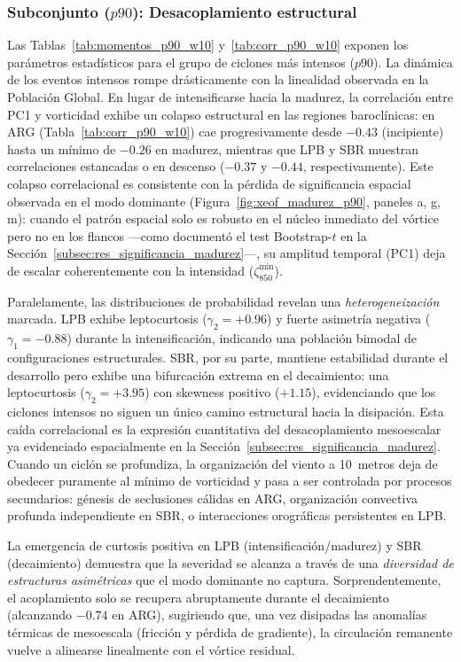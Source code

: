 \subsubsection{Subconjunto ($p90$): Desacoplamiento estructural}

Las Tablas~\ref{tab:momentos_p90_w10} y~\ref{tab:corr_p90_w10} exponen los parámetros estadísticos para el grupo de ciclones más intensos ($p90$). 
La dinámica de los eventos intensos rompe drásticamente con la linealidad observada en la Población Global. 
En lugar de intensificarse hacia la madurez, la correlación entre PC1 y vorticidad exhibe un colapso estructural en las regiones baroclínicas: en ARG (Tabla~\ref{tab:corr_p90_w10}) cae progresivamente desde $-0.43$ (incipiente) hasta un 
mínimo de $-0.26$ en madurez, mientras que LPB y SBR muestran correlaciones estancadas o en descenso ($-0.37$ y $-0.44$, respectivamente). 
Este colapso correlacional es consistente con la pérdida de significancia espacial observada en el modo dominante (Figura~\ref{fig:xeof_madurez_p90}, paneles a, g, m): cuando el patrón espacial solo es robusto en el núcleo inmediato del vórtice pero no en los flancos ---como documentó el test Bootstrap-$t$ en la Sección~\ref{subsec:res_significancia_madurez}---, su amplitud temporal (PC1) deja de escalar coherentemente con la intensidad ($\zeta_{850}^{\min}$).



Paralelamente, las distribuciones de probabilidad revelan una \textit{heterogeneización} marcada. 
LPB exhibe leptocurtosis ($\gamma_2 = +0.96$) y fuerte asimetría negativa ($\gamma_1 = -0.88$) durante la intensificación, indicando una población bimodal de configuraciones estructurales. 
SBR, por su parte, mantiene estabilidad durante el desarrollo pero exhibe una bifurcación extrema en el decaimiento: una leptocurtosis ($\gamma_2 = +3.95$) con skewness positivo ($+1.15$), evidenciando que los ciclones intensos no siguen un único camino estructural hacia la disipación.
Esta caída correlacional es la expresión cuantitativa del desacoplamiento mesoescalar ya evidenciado espacialmente en la Sección~\ref{subsec:res_significancia_madurez}. 
Cuando un ciclón se profundiza, la organización del viento a 10~metros deja de obedecer puramente al mínimo de vorticidad y pasa a ser controlada por procesos secundarios: génesis de seclusiones cálidas en ARG, organización convectiva profunda independiente en SBR, o interacciones orográficas persistentes en LPB. 

La emergencia de curtosis positiva en LPB (intensificación/madurez) y SBR (decaimiento) demuestra que la severidad se alcanza a través de una \textit{diversidad de estructuras asimétricas} que el modo dominante no captura. 
Sorprendentemente, el acoplamiento solo se recupera abruptamente durante el decaimiento (alcanzando $-0.74$ en ARG), sugiriendo que, una vez disipadas las anomalías térmicas de mesoescala (fricción y pérdida de gradiente), la circulación remanente vuelve a alinearse linealmente con el vórtice residual.

